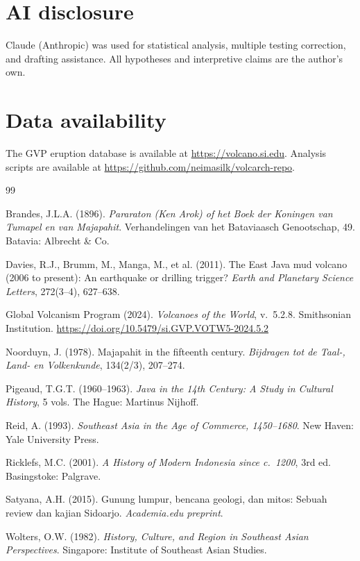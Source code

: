 \documentclass[12pt,a4paper]{article}
\begin{document}
\section*{AI disclosure}

Claude (Anthropic) was used for statistical analysis, multiple testing correction, and drafting assistance.
All hypotheses and interpretive claims are the author's own.

\section*{Data availability}

The GVP eruption database is available at \url{https://volcano.si.edu}.
Analysis scripts are available at \url{https://github.com/neimasilk/volcarch-repo}.



\begin{thebibliography}{99}

Brandes, J.L.A. (1896).
\textit{Pararaton (Ken Arok) of het Boek der Koningen van Tumapel en van Majapahit}.
Verhandelingen van het Bataviaasch Genootschap, 49.
Batavia: Albrecht \& Co.

Davies, R.J., Brumm, M., Manga, M., et al. (2011).
The East Java mud volcano (2006 to present): An earthquake or drilling trigger?
\textit{Earth and Planetary Science Letters}, 272(3--4), 627--638.

Global Volcanism Program (2024).
\textit{Volcanoes of the World}, v.~5.2.8.
Smithsonian Institution.
\url{https://doi.org/10.5479/si.GVP.VOTW5-2024.5.2}

Noorduyn, J. (1978).
Majapahit in the fifteenth century.
\textit{Bijdragen tot de Taal-, Land- en Volkenkunde}, 134(2/3), 207--274.

Pigeaud, T.G.T. (1960--1963).
\textit{Java in the 14th Century: A Study in Cultural History}, 5 vols.
The Hague: Martinus Nijhoff.

Reid, A. (1993).
\textit{Southeast Asia in the Age of Commerce, 1450--1680}.
New Haven: Yale University Press.

Ricklefs, M.C. (2001).
\textit{A History of Modern Indonesia since c.~1200}, 3rd ed.
Basingstoke: Palgrave.

Satyana, A.H. (2015).
Gunung lumpur, bencana geologi, dan mitos: Sebuah review dan kajian Sidoarjo.
\textit{Academia.edu preprint}.

Wolters, O.W. (1982).
\textit{History, Culture, and Region in Southeast Asian Perspectives}.
Singapore: Institute of Southeast Asian Studies.

\end{thebibliography}
\end{document}
